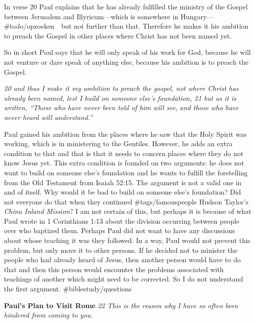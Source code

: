 In verse 20 Paul explains that he has already fulfilled the ministry of
the Gospel between Jerusalem and Illyricum---which is somewhere in
Hungary--- \#todo/opzoeken~~but not further than that. Therefore he
makes it his ambition to preach the Gospel in other places where Christ
has not been named yet.

So in short Paul says that he will only speak of his work for God,
because he will not venture or dare speak of anything else, because his
ambition is to preach the Gospel.

\emph{20 and thus I make it my ambition to preach the gospel, not where
Christ has already been named, lest I build on someone else's
foundation, 21 but as it is written,} \emph{``Those who have never been
told of him will see,} \emph{and those who have never heard will
understand.''}

Paul gained his ambition from the places where he saw that the Holy
Spirit was working, which is in ministering to the Gentiles. However, he
adds an extra condition to that and that is that it needs to concern
places where they do not know Jesus yet. This extra condition is founded
on two arguments: he does not want to build on someone else's foundation
and he wants to fulfill the foretelling from the Old Testament from
Isaiah 52:15. The argument is not a valid one in and of itself. Why
would it be bad to build on someone else's foundation? Did not everyone
do that when they continued \#tags/famouspeople Hudson Taylor's
\emph{China Inland Mission}? I am not certain of this, but perhaps it is
because of what Paul wrote in 1 Corinthians 1:13 about the division
occurring between people over who baptized them. Perhaps Paul did not
want to have any discussions about whose teaching it was they followed.
In a way, Paul would not prevent this problem, but only move it to other
persons. If he decided not to minister the people who had already heard
of Jesus, then another person would have to do that and then this person
would encounter the problems associated with teachings of another which
might need to be corrected. So I do not understand the first argument.
\#biblestudy/questions

\textbf{Paul's Plan to Visit Rome} \emph{22 This is the reason why I
have so often been hindered from coming to you.}

